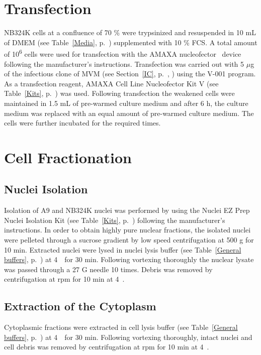\section{Transfection}
NB324K cells at a confluence of 70 \% were trypsinized and resuspended in 10 mL of DMEM (see Table~\ref{Media}, p.~\pageref{Media}) supplemented with 10 \% FCS. A total amount of 10\textsuperscript{6} cells were used for transfection with the AMAXA\textsuperscript{\texttrademark} nucleofector\textsuperscript{\texttrademark}~ device following the manufacturer’s instructions. Transfection was carried out with 5 $\mu$g of the infectious clone of MVM (see Section~\ref{IC}, p.~\pageref{IC}, \cite{pmid6345805}) using the V-001 program. As a transfection reagent, AMAXA\textsuperscript{\textregistered} Cell Line Nucleofector\textsuperscript{\textregistered} Kit V (see Table~\ref{Kits}, p.~\pageref{Kits}) was used. Following transfection the weakened cells were maintained in 1.5 mL of pre-warmed culture medium and after 6 h, the culture medium was replaced with an equal amount of pre-warmed culture medium. The cells were further incubated for the required times.
        

\section{Cell Fractionation}
\label{Fractionation}
\subsection{Nuclei Isolation}
Isolation of A9 and NB324K nuclei was performed by using the Nuclei EZ Prep Nuclei Isolation Kit (see Table~\ref{Kits}, p.~\pageref{Kits}) following the manufacturer’s instructions. In order to obtain highly pure nuclear fractions, the isolated nuclei were pelleted through a sucrose gradient by low speed centrifugation at 500 g for 10 min. Extracted nuclei were lysed in nuclei lysis buffer (see Table~\ref{General buffers}, p.~\pageref{General buffers}) at 4~\textcelsius~for 30 min. Following vortexing thoroughly the nuclear lysate was passed through a 27 G needle 10 times. Debris was removed by centrifugation at  rpm for 10 min at 4~\textcelsius.      

\subsection{Extraction of the Cytoplasm}
Cytoplasmic fractions were extracted in cell lysis buffer (see Table~\ref{General buffers}, p.~\pageref{General buffers}) at 4~\textcelsius~for 30 min. Following vortexing thoroughly, intact nuclei and cell debris was removed by centrifugation at  rpm for 10 min at 4~\textcelsius. 




